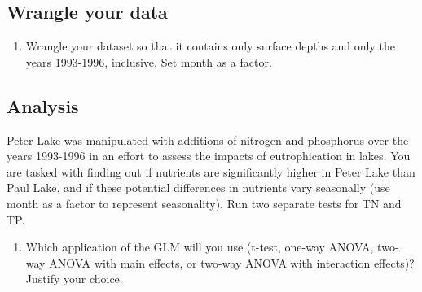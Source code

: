 \documentclass[]{article}
\newenvironment{Shaded}{\begin{snugshade}}{\end{snugshade}}
\newcommand{\CommentTok}[1]{\textcolor[rgb]{0.56,0.35,0.01}{\textit{#1}}}
\newcommand{\DecValTok}[1]{\textcolor[rgb]{0.00,0.00,0.81}{#1}}
\newcommand{\FloatTok}[1]{\textcolor[rgb]{0.00,0.00,0.81}{#1}}
\newcommand{\KeywordTok}[1]{\textcolor[rgb]{0.13,0.29,0.53}{\textbf{#1}}}
\newcommand{\NormalTok}[1]{#1}
\newcommand{\OperatorTok}[1]{\textcolor[rgb]{0.81,0.36,0.00}{\textbf{#1}}}
\newcommand{\StringTok}[1]{\textcolor[rgb]{0.31,0.60,0.02}{#1}}
\providecommand{\tightlist}{%
  \setlength{\itemsep}{0pt}\setlength{\parskip}{0pt}}
\begin{document}
\hypertarget{wrangle-your-data}{%
\subsection{Wrangle your data}\label{wrangle-your-data}}

\begin{enumerate}
\def\labelenumi{\arabic{enumi}.}
\setcounter{enumi}{2}
\tightlist
\item
  Wrangle your dataset so that it contains only surface depths and only
  the years 1993-1996, inclusive. Set month as a factor.
\end{enumerate}

\begin{Shaded}
\end{Shaded}

\hypertarget{analysis}{%
\subsection{Analysis}\label{analysis}}

Peter Lake was manipulated with additions of nitrogen and phosphorus
over the years 1993-1996 in an effort to assess the impacts of
eutrophication in lakes. You are tasked with finding out if nutrients
are significantly higher in Peter Lake than Paul Lake, and if these
potential differences in nutrients vary seasonally (use month as a
factor to represent seasonality). Run two separate tests for TN and TP.

\begin{enumerate}
\def\labelenumi{\arabic{enumi}.}
\setcounter{enumi}{3}
\tightlist
\item
  Which application of the GLM will you use (t-test, one-way ANOVA,
  two-way ANOVA with main effects, or two-way ANOVA with interaction
  effects)? Justify your choice.
\end{enumerate}
\end{document}
